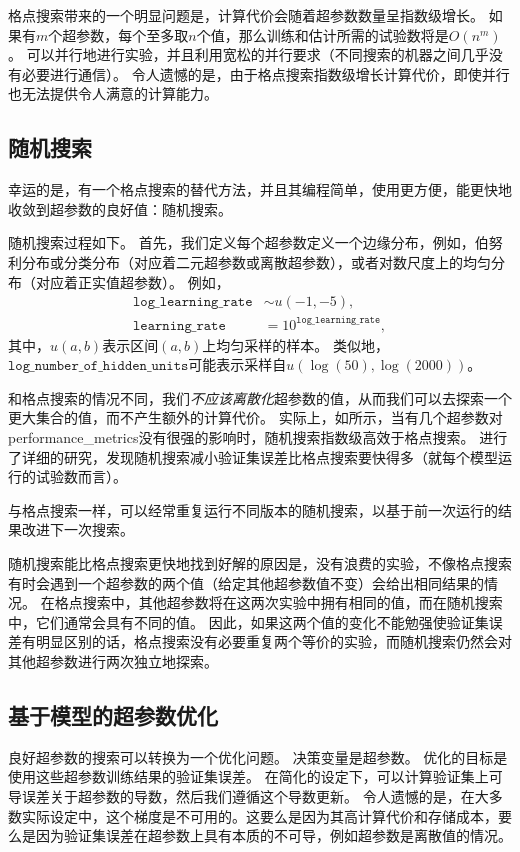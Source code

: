 
格点搜索带来的一个明显问题是，计算代价会随着超参数数量呈指数级增长。
如果有$m$个超参数，每个至多取$n$个值，那么训练和估计所需的试验数将是$O(n^m)$。
可以并行地进行实验，并且利用宽松的并行要求（不同搜索的机器之间几乎没有必要进行通信）。
令人遗憾的是，由于格点搜索指数级增长计算代价，即使并行也无法提供令人满意的计算能力。


\subsection{随机搜索}
\label{sec:random_search}
幸运的是，有一个格点搜索的替代方法，并且其编程简单，使用更方便，能更快地收敛到超参数的良好值：随机搜索\citep{Bergstra+Bengio-2012-small}。

随机搜索过程如下。
首先，我们定义每个超参数定义一个边缘分布，例如，伯努利分布或分类分布（对应着二元超参数或离散超参数），或者对数尺度上的均匀分布（对应着正实值超参数）。
例如，
\begin{align}
	\texttt{log\_learning\_rate} &\sim u(-1, -5), \\
	\texttt{learning\_rate} &= 10^{\texttt{log\_learning\_rate}},
\end{align}
其中，$u(a,b)$表示区间$(a,b)$上均匀采样的样本。
类似地，$\texttt{log\_number\_of\_hidden\_units}$可能表示采样自$u(\log(50), \log(2000))$。

和格点搜索的情况不同，我们\emph{不应该离散化}超参数的值，从而我们可以去探索一个更大集合的值，而不产生额外的计算代价。
实际上，如所示，当有几个超参数对\gls{performance_metrics}没有很强的影响时，随机搜索指数级高效于格点搜索。
\cite{Bergstra+Bengio-2012-small}进行了详细的研究，发现随机搜索减小验证集误差比格点搜索要快得多（就每个模型运行的试验数而言）。

与格点搜索一样，可以经常重复运行不同版本的随机搜索，以基于前一次运行的结果改进下一次搜索。

随机搜索能比格点搜索更快地找到好解的原因是，没有浪费的实验，不像格点搜索有时会遇到一个超参数的两个值（给定其他超参数值不变）会给出相同结果的情况。
在格点搜索中，其他超参数将在这两次实验中拥有相同的值，而在随机搜索中，它们通常会具有不同的值。
因此，如果这两个值的变化不能勉强使验证集误差有明显区别的话，格点搜索没有必要重复两个等价的实验，而随机搜索仍然会对其他超参数进行两次独立地探索。


\subsection{基于模型的超参数优化}
\label{sec:model_based_hyperparameter_optimization}
良好超参数的搜索可以转换为一个优化问题。
决策变量是超参数。
优化的目标是使用这些超参数训练结果的验证集误差。
在简化的设定下，可以计算验证集上可导误差关于超参数的导数，然后我们遵循这个导数更新\citep{bengio:1999:snowbird,bengio-hyper-NC00,maclaurin2015gradient}。
令人遗憾的是，在大多数实际设定中，这个梯度是不可用的。这要么是因为其高计算代价和存储成本，要么是因为验证集误差在超参数上具有本质的不可导，例如超参数是离散值的情况。


